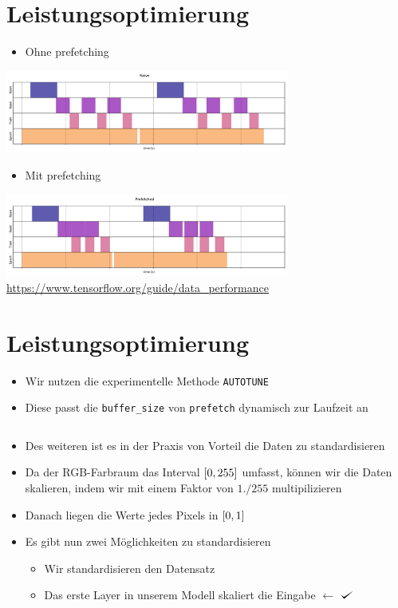 \documentclass[t]{beamer}
\def\checkmark{\tikz\fill[scale=0.4](0,.35) -- (.25,0) -- (1,.7) -- (.25,.15) -- cycle;}
\newcommand\pycode[1]{\inputminted[frame=lines, framesep=2mm, fontsize=\normalsize]{python}{#1}}
\begin{document}
\section{Leistungsoptimierung}
\begin{frame}
    \begin{itemize}
        \item Ohne prefetching
    \end{itemize}
    \includegraphics[width=0.7\textwidth]{teach-plots/naive-prefetching-crop.pdf}
    \begin{itemize}
        \item Mit prefetching
    \end{itemize}
    \includegraphics[width=0.7\textwidth]{teach-plots/prefetched-crop.pdf}
    \large\href{https://www.tensorflow.org/guide/data_performance}{https://www.tensorflow.org/guide/data\_performance}
\end{frame}

\section{Leistungsoptimierung}
\begin{frame}
    \begin{itemize}
        \item Wir nutzen die experimentelle Methode \texttt{AUTOTUNE}
        \item Diese passt die \texttt{buffer\_size} von \texttt{prefetch} dynamisch zur Laufzeit an
        \pycode{./code-snippets/dataset-optimize.py}
        \item Des weiteren ist es in der Praxis von Vorteil die Daten zu standardisieren
        \item Da der RGB-Farbraum das Interval \(\interval{0}{255}\) umfasst, können wir die Daten skalieren, indem wir mit einem Faktor von \(1./255\) multipilizieren
        \item Danach liegen die Werte jedes Pixels in \(\interval{0}{1}\)
        \newline  
        \item Es gibt nun zwei Möglichkeiten zu standardisieren
        \begin{itemize}
            \item Wir standardisieren den Datensatz
            \item Das erste Layer in unserem Modell skaliert die Eingabe \quad \textcolor{rwthblue}{\(\leftarrow\)} \textcolor{rwthblue}{\(\checkmark\)}
        \end{itemize}
    \end{itemize}
\end{frame}
\end{document}
